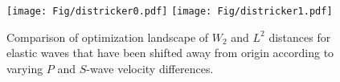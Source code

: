 
\begin{figure}
\texttt{[image: Fig/districker0.pdf]}
\texttt{[image: Fig/districker1.pdf]}
\caption{Comparison of optimization landscape of $W_2$ and $L^2$ distances for elastic waves that have been shifted away from origin according to varying $P$ and $S$-wave velocity differences.}
\label{fig:ricker-madagascar}
\end{figure}


